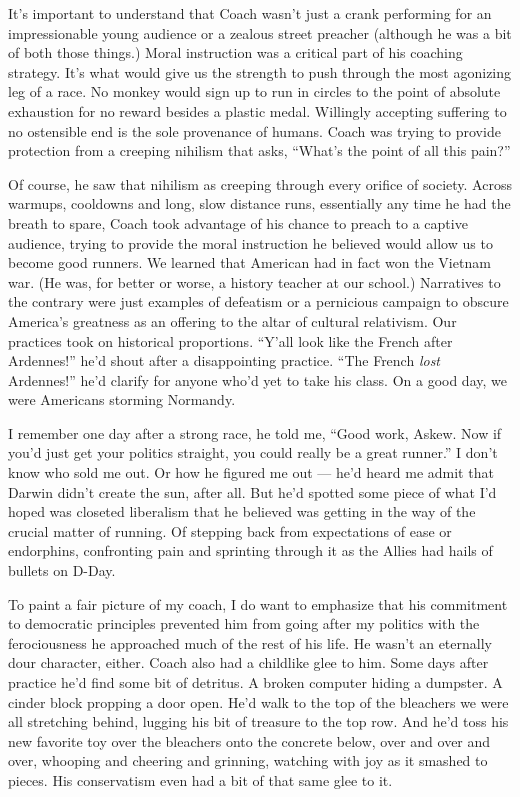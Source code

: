 \documentclass[12pt, oneside]{memoir}
\begin{document}
It's important to understand that Coach wasn't just a crank performing
for an impressionable young audience or a zealous street preacher
(although he was a bit of both those things.)
Moral instruction was a critical part of his coaching strategy.
It's what would give us the strength to push through the most
agonizing leg of a race.
No monkey would sign up to run in circles to the point of absolute
exhaustion for no reward besides a plastic medal.
Willingly accepting suffering to no ostensible end is the sole
provenance of humans.
Coach was trying to provide protection from a creeping nihilism that
asks, ``What's the point of all this pain?''

Of course, he saw that nihilism as creeping through every orifice of
society.
Across warmups, cooldowns and long, slow distance runs, essentially
any time he had the breath to spare, Coach took advantage of his
chance to preach to a captive audience, trying to provide the moral
instruction he believed would allow us to become good runners.
We learned that American had in fact won the Vietnam war.
(He was, for better or worse, a history teacher at our school.)
Narratives to the contrary were just examples of defeatism or a
pernicious campaign to obscure America's greatness as an offering to
the altar of cultural relativism.
Our practices took on historical proportions.
``Y'all look like the French after Ardennes!'' he'd shout after a
disappointing practice.
``The French \textit{lost} Ardennes!'' he'd clarify for anyone who'd
yet to take his class.
On a good day, we were Americans storming Normandy.

I remember one day after a strong race, he told me, ``Good work,
Askew. Now if you'd just get your politics straight, you could really
be a great runner.''
I don't know who sold me out.
Or how he figured me out --- he'd heard me admit that Darwin didn't
create the sun, after all.
But he'd spotted some piece of what I'd hoped was closeted liberalism
that he believed was getting in the way of the crucial matter of
running.
Of stepping back from expectations of ease or endorphins, confronting
pain and sprinting through it as the Allies had hails of bullets on
D-Day.

To paint a fair picture of my coach, I do want to emphasize that his
commitment to democratic principles prevented him from going after my
politics with the ferociousness he approached much of the rest of his
life.
He wasn't an eternally dour character, either.
Coach also had a childlike glee to him.
Some days after practice he'd find some bit of detritus.
A broken computer hiding a dumpster.
A cinder block propping a door open.
He'd walk to the top of the bleachers we were all stretching behind,
lugging his bit of treasure to the top row.
And he'd toss his new favorite toy over the bleachers onto the
concrete below, over and over and over, whooping and cheering and
grinning, watching with joy as it smashed to pieces.
His conservatism even had a bit of that same glee to it.
\end{document}
